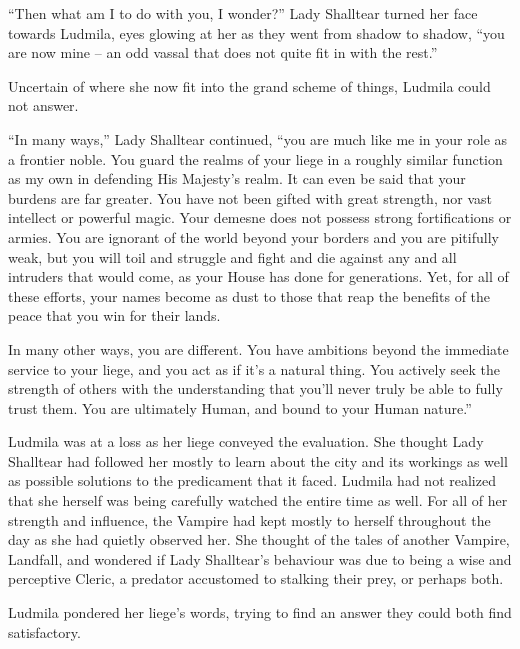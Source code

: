  

“Then what am I to do with you, I wonder?” Lady Shalltear turned her face towards Ludmila, eyes glowing at her as they went from shadow to shadow, “you are now mine – an odd vassal that does not quite fit in with the rest.”

 

Uncertain of where she now fit into the grand scheme of things, Ludmila could not answer.

 

“In many ways,” Lady Shalltear continued, “you are much like me in your role as a frontier noble. You guard the realms of your liege in a roughly similar function as my own in defending His Majesty’s realm. It can even be said that your burdens are far greater. You have not been gifted with great strength, nor vast intellect or powerful magic. Your demesne does not possess strong fortifications or armies. You are ignorant of the world beyond your borders and you are pitifully weak, but you will toil and struggle and fight and die against any and all intruders that would come, as your House has done for generations. Yet, for all of these efforts, your names become as dust to those that reap the benefits of the peace that you win for their lands.

 

In many other ways, you are different. You have ambitions beyond the immediate service to your liege, and you act as if it’s a natural thing. You actively seek the strength of others with the understanding that you’ll never truly be able to fully trust them. You are ultimately Human, and bound to your Human nature.”

 

Ludmila was at a loss as her liege conveyed the evaluation. She thought Lady Shalltear had followed her mostly to learn about the city and its workings as well as possible solutions to the predicament that it faced. Ludmila had not realized that she herself was being carefully watched the entire time as well. For all of her strength and influence, the Vampire had kept mostly to herself throughout the day as she had quietly observed her. She thought of the tales of another Vampire, Landfall, and wondered if Lady Shalltear’s behaviour was due to being a wise and perceptive Cleric, a predator accustomed to stalking their prey, or perhaps both.

 

Ludmila pondered her liege’s words, trying to find an answer they could both find satisfactory.

